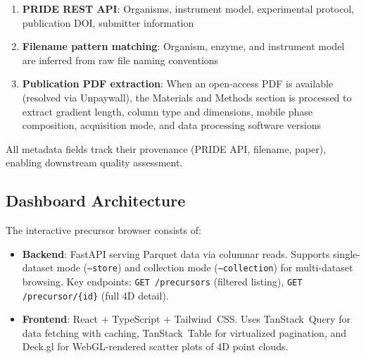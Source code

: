 \documentclass[10pt,twoside]{article}
\begin{document}
\begin{enumerate}
    \item \textbf{PRIDE REST API}: Organisms, instrument model, experimental protocol, publication DOI, submitter information
    \item \textbf{Filename pattern matching}: Organism, enzyme, and instrument model are inferred from raw file naming conventions
    \item \textbf{Publication PDF extraction}: When an open-access PDF is available (resolved via Unpaywall), the Materials and Methods section is processed to extract gradient length, column type and dimensions, mobile phase composition, acquisition mode, and data processing software versions
\end{enumerate}


All metadata fields track their provenance (PRIDE API, filename, paper), enabling downstream quality assessment.

\subsection{Dashboard Architecture}

The interactive precursor browser consists of:

\begin{itemize}
    \item \textbf{Backend}: FastAPI serving Parquet data via columnar reads.
          Supports single-dataset mode (\texttt{--store}) and collection mode (\texttt{--collection}) for multi-dataset browsing.
          Key endpoints: \texttt{GET /precursors} (filtered listing), \texttt{GET /precursor/\{id\}} (full 4D detail).
    \item \textbf{Frontend}: React + TypeScript + Tailwind~CSS.
          Uses TanStack~Query for data fetching with caching, TanStack~Table for virtualized pagination, and Deck.gl for WebGL-rendered scatter plots of 4D point clouds.
\end{itemize}
\end{document}
